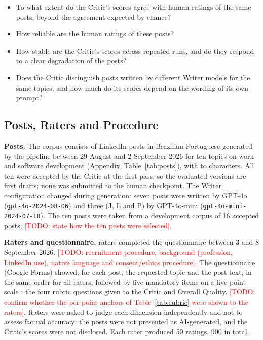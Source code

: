 \documentclass[a4paper,twoside]{article}
\newcommand{\TODO}[1]{\textcolor{red}{[TODO: #1]}}
\begin{document}
\begin{itemize}
\item[\textbf{RQ1}] To what extent do the Critic's scores agree with human ratings of the same posts, beyond the agreement expected by chance?
\item[\textbf{RQ2}] How reliable are the human ratings of these posts?
\item[\textbf{RQ3}] How stable are the Critic's scores across repeated runs, and do they respond to a clear degradation of the posts?
\item[\textbf{RQ4}] Does the Critic distinguish posts written by different Writer models for the same topics, and how much do its scores depend on the wording of its own prompt?
\end{itemize}

\subsection{Posts, Raters and Procedure}
\label{sec:setup}

\textbf{Posts.} The corpus consists of \NPosts{} LinkedIn posts in Brazilian Portuguese generated by the pipeline between 29 August and 2 September 2026 for ten topics on work and software development (Appendix, Table~\ref{tab:posts}), with \CharMin{} to \CharMax{} characters. All ten were accepted by the Critic at the first pass, so the evaluated versions are first drafts; none was submitted to the human checkpoint. The Writer configuration changed during generation: seven posts were written by GPT-4o (\texttt{gpt-4o-2024-08-06}) and three (J, L and P) by GPT-4o-mini (\texttt{gpt-4o-mini-2024-07-18}). The ten posts were taken from a development corpus of 16 accepted posts; \TODO{state how the ten posts were selected}.

\textbf{Raters and questionnaire.} \NRaters{} raters completed the questionnaire between 3 and 8 September 2026. \TODO{recruitment procedure, background (profession, LinkedIn use), native language and consent/ethics procedure}. The questionnaire (Google Forms) showed, for each post, the requested topic and the post text, in the same order for all raters, followed by five mandatory items on a five-point scale \cite{likert1932technique,krosnick1999maximizing}: the four rubric questions given to the Critic and Overall Quality. \TODO{confirm whether the per-point anchors of Table~\ref{tab:rubric} were shown to the raters}. Raters were asked to judge each dimension independently and not to assess factual accuracy; the posts were not presented as AI-generated, and the Critic's scores were not disclosed. Each rater produced 50 ratings, 900 in total.
\end{document}
